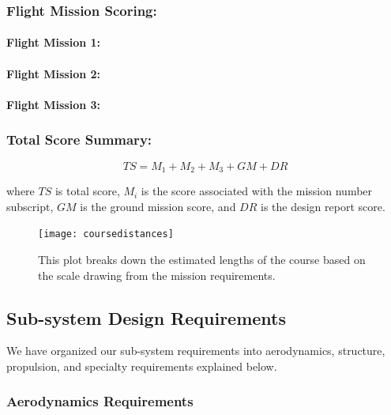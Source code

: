 \documentclass[report]{byu-aero}
\begin{document}
\subsubsection{Flight Mission Scoring:}



\paragraph{Flight Mission 1:}



\paragraph{Flight Mission 2:}



\paragraph{Flight Mission 3:}



\subsubsection{Total Score Summary:}

\[TS = M_1 + M_2 + M_3 + GM + DR\]

where \(TS\) is total score, \(M_i\) is the score associated with the mission number subscript, \(GM\) is the ground mission score, and \(DR\) is the design report score.

\begin{figure}[h!]
	\centering
	\texttt{[image: coursedistances]}
	\caption{This plot breaks down the estimated lengths of the course based on the scale drawing from the mission requirements.}
	\label{fig:course}
\end{figure}

\subsection{Sub-system Design Requirements}
\label{ssec:MissionReqs}

We have organized our sub-system requirements into aerodynamics, structure, propulsion, and specialty requirements explained below.

\subsubsection{Aerodynamics Requirements}
\label{sssec:AerodynamicReqs}
\end{document}
